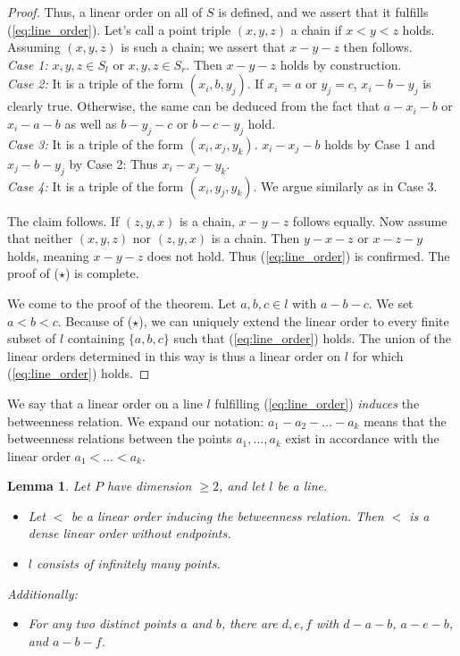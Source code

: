 \documentclass[11pt,a4paper]{article}
\newcommand{\betw}[3]{#1 - #2 - #3}
\newtheorem{lemma}[theorem]{Lemma}
\begin{document}
\begin{proof}
Thus, a linear order on all of $S$ is defined, and we assert that it fulfills (\ref{eq:line_order}). Let's call a point triple $(x, y, z)$ a chain if $x < y < z$ holds. Assuming $(x, y, z)$ is such a chain; we assert that $\betw{x}{y}{z}$ then follows. \\
\textit{Case 1:} $x, y, z \in S_l$ or $x, y, z \in S_r$. Then $\betw{x}{y}{z}$ holds by construction. \\
\textit{Case 2:} It is a triple of the form $(x_i, b, y_j)$. If $x_i = a$ or $y_j = c$, $\betw{x_i}{b}{y_j}$ is clearly true. Otherwise, the same can be deduced from the fact that $\betw{a}{x_i}{b}$ or $\betw{x_i}{a}{b}$ as well as $\betw{b}{y_j}{c}$ or $\betw{b}{c}{y_j}$ hold. \\
\textit{Case 3:} It is a triple of the form $(x_i, x_j, y_k)$. $\betw{x_i}{x_j}{b}$ holds by Case 1 and $\betw{x_j}{b}{y_j}$ by Case 2: Thus $\betw{x_i}{x_j}{y_k}$. \\
\textit{Case 4:} It is a triple of the form $(x_i, y_j, y_k)$. We argue similarly as in Case 3.

The claim follows. If $(z, y, x)$ is a chain, $\betw{x}{y}{z}$ follows equally. Now assume that neither $(x, y, z)$ nor $(z, y, x)$ is a chain. Then $\betw{y}{x}{z}$ or $\betw{x}{z}{y}$ holds, meaning $\betw{x}{y}{z}$ does not hold. Thus (\ref{eq:line_order}) is confirmed. The proof of ($\star$) is complete.

We come to the proof of the theorem. Let $a, b, c \in l$ with $\betw{a}{b}{c}$. We set $a < b < c$. Because of ($\star$), we can uniquely extend the linear order to every finite subset of $l$ containing $\{a, b, c\}$ such that (\ref{eq:line_order}) holds. The union of the linear orders determined in this way is thus a linear order on $l$ for which (\ref{eq:line_order}) holds.
\end{proof}

We say that a linear order on a line $l$ fulfilling (\ref{eq:line_order}) \textit{induces} the betweenness relation. We expand our notation: $\betw{a_1}{a_2}{\dots - a_k}$ means that the betweenness relations between the points $a_1, \dots, a_k$ exist in accordance with the linear order $a_1 < \dots < a_k$.

\begin{lemma} \label{lem:dense_line}
Let $P$ have dimension $\ge 2$, and let $l$ be a line.
\begin{itemize}
    \item[(i)] Let $<$ be a linear order inducing the betweenness relation. Then $<$ is a dense linear order without endpoints.
    \item[(ii)] $l$ consists of infinitely many points.
\end{itemize}
Additionally:
\begin{itemize}
    \item[(Z11')] For any two distinct points $a$ and $b$, there are $d, e, f$ with $\betw{d}{a}{b}$, $\betw{a}{e}{b}$, and $\betw{a}{b}{f}$.
\end{itemize}
\end{lemma}
\end{document}
